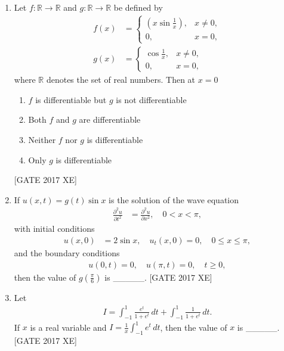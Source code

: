 \documentclass[journal,12pt,onecolumn]{IEEEtran}
\theoremstyle{remark}
\begin{document}
\begin{enumerate}
    \item Let $f:\mathbb{R} \to \mathbb{R}$ and $g:\mathbb{R} \to \mathbb{R}$ be defined by
    \begin{align}
        f(x) &= \begin{cases}
        (x \sin \tfrac{1}{x}), & x \neq 0, \\
        0, & x = 0,
        \end{cases} \\
        g(x) &= \begin{cases}
        \cos \tfrac{1}{x}, & x \neq 0, \\
        0, & x = 0,
        \end{cases}
    \end{align}
    where $\mathbb{R}$ denotes the set of real numbers. Then at $x=0$
    \begin{multicols}{2}
    \begin{enumerate}
        \item $f$ is differentiable but $g$ is not differentiable
        \item Both $f$ and $g$ are differentiable
        \item Neither $f$ nor $g$ is differentiable
        \item Only $g$ is differentiable
    \end{enumerate}
    \end{multicols}
    \hfill [GATE 2017 XE]

    \item If $u(x,t) = g(t) \sin x$ is the solution of the wave equation
    \begin{align}
        \frac{\partial^2 u}{\partial t^2} &= \frac{\partial^2 u}{\partial x^2}, \quad 0 < x < \pi,
    \end{align}
    with initial conditions
    \begin{align}
        u(x,0) &= 2 \sin x, \quad u_t(x,0) = 0, \quad 0 \leq x \leq \pi,
    \end{align}
    and the boundary conditions
    \begin{align}
        u(0,t) = 0, \quad u(\pi,t) = 0, \quad t \geq 0,
    \end{align}
    then the value of $g(\tfrac{\pi}{6})$ is \_\_\_\_\_.
    \hfill [GATE 2017 XE]

    \item Let
    \begin{align}
        I = \int_{-1}^{1} \frac{e^t}{1+e^t}\,dt + \int_{-1}^{1} \frac{1}{1+e^t}\,dt.
    \end{align}
    If $x$ is a real variable and $I = \tfrac{1}{x} \int_{-1}^{1} e^t\, dt$,  
    then the value of $x$ is \_\_\_\_\_.
    \hfill [GATE 2017 XE]


\end{enumerate}
\end{document}
